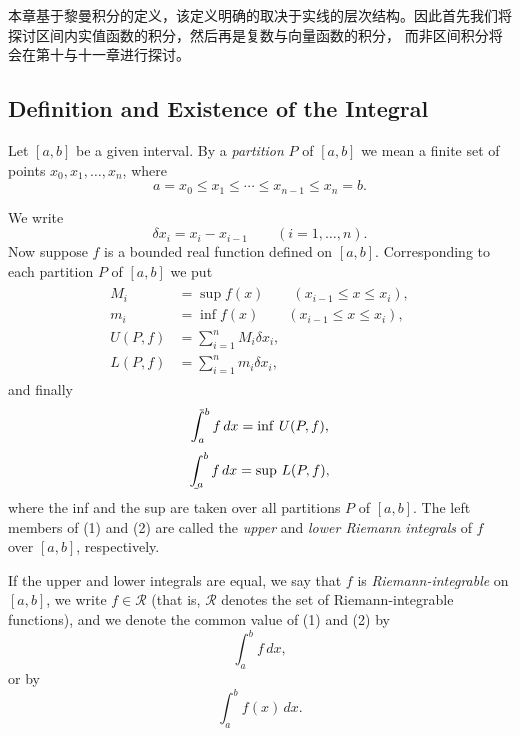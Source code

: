 \documentclass[../poma-notes.tex]{subfiles}
\begin{document}
本章基于黎曼积分的定义，该定义明确的取决于实线的层次结构。因此首先我们将探讨区间内实值函数的积分，然后再是复数与向量函数的积分，
而非区间积分将会在第十与十一章进行探讨。

\subsection*{Definition and Existence of the Integral}

\begin{definition}
  Let $[a,b]$ be a given interval. By a \textit{partition} $P$ of $[a,b]$ we mean a finite set of points
  $x_0, x_1, \dots, x_n$, where
  \[
    a = x_0 \le x_1 \le \cdots \le x_{n-1} \le x_n = b.
  \]

  We write
  \[
    \delta x_i = x_i - x_{i-1} \qquad (i=1,\dots,n).
  \]
  Now suppose $f$ is a bounded real function defined on $[a,b]$. Corresponding to each partition $P$ of
  $[a,b]$ we put
  \begin{align*}
    \begin{split}
      M_i &= \sup f(x) \qquad (x_{i-1} \le x \le x_i), \\
      m_i &= \inf f(x) \qquad (x_{i-1} \le x \le x_i), \\
      U(P,f) &= \sum_{i=1}^{n} M_i \delta x_i, \\
      L(P,f) &= \sum_{i=1}^{n} m_i \delta x_i,
    \end{split}
  \end{align*}
  and finally
  \begin{equation}
    \tint_{a}^{b} f \,dx = \inf\, U(P, f),
  \end{equation}
  \begin{equation}
    \bint_{a}^{b} f \,dx = \sup\, L(P, f),
  \end{equation}
  where the inf and the sup are taken over all partitions $P$ of $[a,b]$. The left members of (1) and (2)
  are called the \textit{upper} and \textit{lower Riemann integrals} of $f$ over $[a,b]$, respectively.

  If the upper and lower integrals are equal, we say that $f$ is \textit{Riemann-integrable} on $[a,b]$,
  we write $f \in \mathscr{R}$ (that is, $\mathscr{R}$ denotes the set of Riemann-integrable functions),
  and we denote the common value of (1) and (2) by
  \begin{equation}
    \int_{a}^{b}f\,dx,
  \end{equation}
  or by
  \begin{equation}
    \int_{a}^{b}f(x)\,dx.
  \end{equation}


\end{definition}
\end{document}
